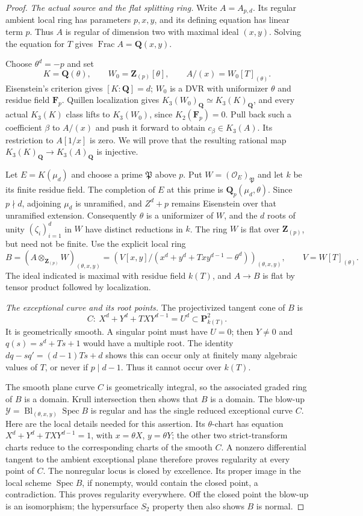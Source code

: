 \documentclass[11pt,a4paper]{amsart}
\numberwithin{equation}{section}
\theoremstyle{definition}
\theoremstyle{remark}
\newcommand{\Q}{\mathbf Q}
\newcommand{\Z}{\mathbf Z}
\newcommand{\F}{\mathbf F}
\newcommand{\Spec}{\operatorname{Spec}}
\newcommand{\Frac}{\operatorname{Frac}}
\begin{document}
\begin{proof}
\emph{The actual source and the flat splitting ring.}
Write $A=A_{p,d}$. Its regular ambient local ring has parameters
$p,x,y$, and its defining equation has linear term $p$.
Thus $A$ is regular of dimension two with maximal ideal $(x,y)$.
Solving the equation for $T$ gives $\Frac A=\Q(x,y)$.

Choose $\theta^d=-p$ and set
\[
 K=\Q(\theta),\qquad W_0=\Z_{(p)}[\theta],\qquad
 A/(x)=W_0[T]_{(\theta)}.
\]
Eisenstein's criterion gives $[K:\Q]=d$; $W_0$ is a DVR with
uniformizer $\theta$ and residue field $\F_p$.
Quillen localization gives
$K_3(W_0)_{\Q}\simeq K_3(K)_{\Q}$, and every actual
$K_3(K)$ class lifts to $K_3(W_0)$, since $K_2(\F_p)=0$.
Pull back such a coefficient $\beta$ to $A/(x)$ and push it
forward to obtain $c_\beta\in K_3(A)$. Its restriction to
$A[1/x]$ is zero. We will prove that the resulting rational map
$K_3(K)_{\Q}\to K_3(A)_{\Q}$ is injective.

Let $E=K(\mu_d)$ and choose a prime $\mathfrak P$ above $p$.
Put $W=(\mathcal O_E)_{\mathfrak P}$ and let $k$ be its finite
residue field. The completion of $E$ at this prime is
$\Q_p(\mu_d,\theta)$. Since $p\nmid d$, adjoining $\mu_d$
is unramified, and $Z^d+p$ remains Eisenstein over that
unramified extension. Consequently $\theta$ is a uniformizer
of $W$, and the $d$ roots of unity $(\zeta_i)_{i=1}^d$ in $W$ have distinct
reductions in $k$.
The ring $W$ is flat over $\Z_{(p)}$, but need not be finite.
Use the explicit local ring
\[
 B=(A\otimes_{\Z_{(p)}}W)_{(\theta,x,y)}
  =\left(V[x,y]/
      (x^d+y^d+Txy^{d-1}-\theta^d)\right)_{(\theta,x,y)},
 \qquad V=W[T]_{(\theta)}.
\]
The ideal indicated is maximal with residue field $k(T)$, and
$A\to B$ is flat by tensor product followed by localization.

\emph{The exceptional curve and its root points.}
The projectivized tangent cone of $B$ is
\[
 C:\ X^d+Y^d+TXY^{d-1}=U^d
       \subset\mathbf P^2_{k(T)}.
\]
It is geometrically smooth. A singular point must have $U=0$;
then $Y\ne0$ and $q(s)=s^d+Ts+1$ would have a multiple root.
The identity $dq-sq'=(d-1)Ts+d$ shows this can occur only at
finitely many algebraic values of $T$, or never if $p\mid d-1$.
Thus it cannot occur over $k(T)$.

The smooth plane curve $C$ is geometrically integral, so the
associated graded ring of $B$ is a domain. Krull intersection
then shows that $B$ is a domain. The blow-up
$\mathcal Y=\operatorname{Bl}_{(\theta,x,y)}\Spec B$
is regular and has the single reduced exceptional curve $C$.
Here are the local details needed for this assertion. Its
$\theta$-chart has equation
$X^d+Y^d+TXY^{d-1}=1$, with $x=\theta X$, $y=\theta Y$;
the other two strict-transform charts reduce to the corresponding
charts of the smooth $C$. A nonzero differential tangent to
the ambient exceptional plane therefore proves regularity at
every point of $C$. The nonregular locus is closed by excellence.
Its proper image in the local scheme $\Spec B$, if nonempty,
would contain the closed point, a contradiction. This proves
regularity everywhere.
Off the closed point the blow-up is an isomorphism; the
hypersurface $S_2$ property then also shows $B$ is normal.


\end{proof}
\end{document}
